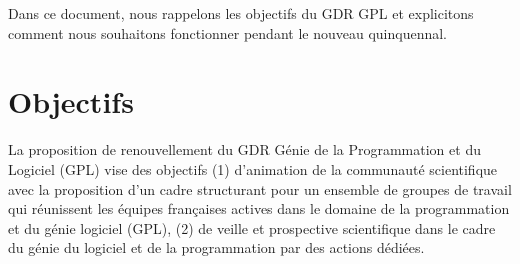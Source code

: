 \documentclass[11pt]{article}
\newcommand{\mynote}[3][black]{\textcolor{#1}{\fbox{\bfseries\sffamily\scriptsize{#2}}
{\small$\blacktriangleright$\textsf{\emph{#3}}$\blacktriangleleft$}}}
\newcommand{\TODO}[1]{\mynote[red]{TODO}{#1}}
\begin{document}
%


%

Dans ce document, nous rappelons les objectifs du GDR GPL et explicitons comment nous souhaitons fonctionner pendant le nouveau quinquennal. 

\section{Objectifs}
La proposition de renouvellement du GDR Génie de la Programmation et du
Logiciel (GPL) vise des objectifs (1)  d'animation de la communauté scientifique
avec la proposition d'un cadre structurant pour un ensemble de groupes de
travail qui réunissent les équipes françaises actives dans le domaine de la
programmation et du génie logiciel (GPL), (2) de veille et prospective scientifique dans le cadre du génie du logiciel et de la programmation par des actions dédiées.

\end{document}
